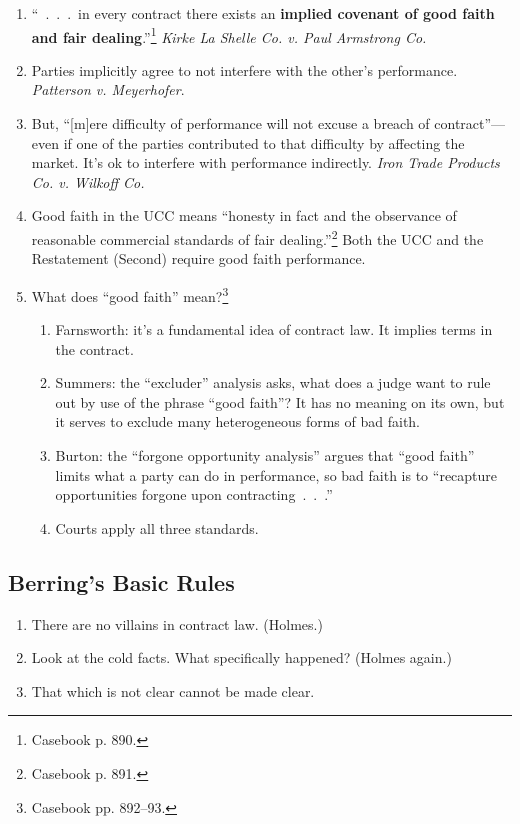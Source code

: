 \begin{enumerate}
\begin{enumerate}
        \item ``~.~.~.~in every contract there exists an \textbf{implied 
        covenant of good faith and fair dealing}.''\footnote{Casebook p. 890.} 
        \emph{Kirke La Shelle Co. v. Paul Armstrong Co.}
        \item Parties implicitly agree to not interfere with the other's 
        performance. \emph{Patterson v. Meyerhofer}.
        \item But, ``[m]ere difficulty of performance will not excuse a breach 
        of contract''---even if one of the parties contributed to that 
        difficulty by affecting the market. It's ok to interfere with 
        performance indirectly. \emph{Iron Trade Products Co. v. Wilkoff Co.}
        \item Good faith in the UCC means ``honesty in fact and the observance 
        of reasonable commercial standards of fair 
        dealing.''\footnote{Casebook p. 891.} Both the UCC and the Restatement 
        (Second) require good faith performance.
        \item What does ``good faith'' mean?\footnote{Casebook pp. 892--93.}
        \begin{enumerate}
            \item Farnsworth: it's a fundamental idea of contract law. It implies 
            terms in the contract.
            \item Summers: the ``excluder'' analysis asks, what does a judge want 
            to rule out by use of the phrase ``good faith''? It has no meaning on 
            its own, but it serves to exclude many heterogeneous forms of bad 
            faith.
            \item Burton: the ``forgone opportunity analysis'' argues that ``good 
            faith'' limits what a party can do in performance, so bad faith is to 
            ``recapture opportunities forgone upon 
            contracting~.~.~.''
            \item Courts apply all three standards.
        \end{enumerate}
    \end{enumerate}
\end{enumerate}

\subsection{Berring's Basic Rules}

\begin{enumerate}
    \item There are no villains in contract law. (Holmes.)
    \item Look at the cold facts. What specifically happened? (Holmes again.)
    \item That which is not clear cannot be made clear.
\end{enumerate}
